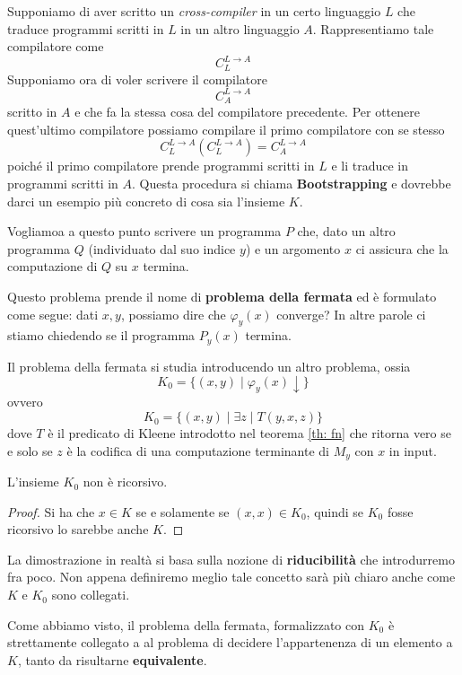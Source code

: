 Supponiamo di aver scritto un \emph{cross-compiler} in un certo
linguaggio $L$ che traduce programmi scritti in $L$ in un altro
linguaggio $A$. Rappresentiamo tale compilatore come
\[ C_L^{L \rightarrow A} \]
Supponiamo ora di voler scrivere il compilatore
\[ C_A^{L \rightarrow A} \]
scritto in $A$ e che fa la stessa cosa del compilatore
precedente. Per ottenere quest'ultimo compilatore possiamo
compilare il primo compilatore con se stesso
\[
	C_L^{L \rightarrow A} (C_L^{L \rightarrow A}) =
	C_A^{L \rightarrow A}
\]
poiché il primo compilatore prende programmi scritti in $L$ e li
traduce in programmi scritti in $A$. Questa procedura si chiama
\textbf{Bootstrapping} e dovrebbe darci un esempio più concreto
di cosa sia l'insieme $K$.

Vogliamoa a questo punto scrivere un programma $P$ che, dato un
altro programma $Q$ (individuato dal suo indice $y$) e un
argomento $x$ ci assicura che la computazione di $Q$ su $x$
termina.

Questo problema prende il nome di \textbf{problema della fermata}
ed è formulato come segue: dati $x, y$, possiamo dire che
$\varphi_y (x)$ converge? In altre parole ci stiamo chiedendo se
il programma $P_y (x)$ termina.

Il problema della fermata si studia introducendo un altro
problema, ossia
\[ K_0 = \{ (x, y) \mid \varphi_y (x) \downarrow \} \]
ovvero
\[ K_0 = \{ (x, y) \mid \exists z \mid T(y,x,z) \} \]
dove $T$ è il predicato di Kleene introdotto nel teorema
\ref{th: fn} che ritorna vero se e solo se $z$ è la codifica di
una computazione terminante di $M_y$ con $x$ in input.

\begin{corollary}
	L'insieme $K_0$ non è ricorsivo.
	\begin{proof}
		Si ha che $x \in K$ se e solamente se $(x, x) \in K_0$,
		quindi se $K_0$ fosse ricorsivo lo sarebbe anche $K$.
	\end{proof}
\end{corollary}

La dimostrazione in realtà si basa sulla nozione di
\textbf{riducibilità} che introdurremo fra poco. Non appena
definiremo meglio tale concetto sarà più chiaro anche come
$K$ e $K_0$ sono collegati.

Come abbiamo visto, il problema della fermata, formalizzato con
$K_0$ è strettamente collegato a al problema di decidere
l'appartenenza di un elemento a $K$, tanto da risultarne
\textbf{equivalente}.